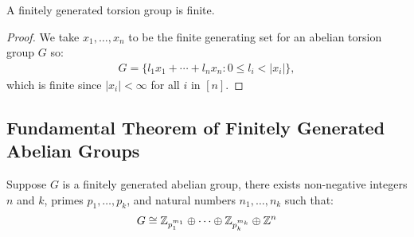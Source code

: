 A finitely generated torsion group is finite.

\begin{proof}
    We take $x_1, \ldots, x_n$ to be the finite generating set for
    an abelian torsion group $G$ so: \begin{align*}
        G = \{l_1x_1 + \cdots + l_nx_n : 0 \leq l_i < |x_i|\},
    \end{align*} which is finite since $|x_i| < \infty$ for all $i$ in $[n]$.
\end{proof}

\subsection{Fundamental Theorem of Finitely Generated Abelian Groups}

Suppose $G$ is a finitely generated abelian group, there exists
non-negative integers $n$ and $k$, primes $p_1, \ldots, p_k$, and
natural numbers $n_1, \ldots, n_k$ such that: \begin{align*}
    G \cong \mathbb{Z}_{p_1^{m_1}} \oplus \cdots 
    \oplus \mathbb{Z}_{p_k^{m_k}} \oplus \mathbb{Z}^n
\end{align*}
